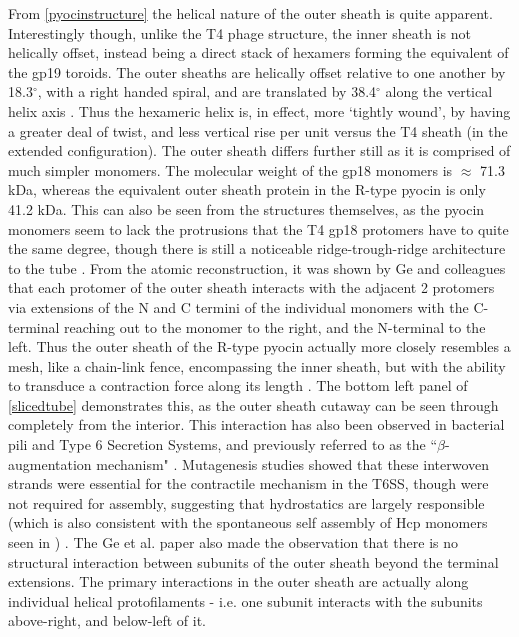 From \vref{pyocinstructure} the helical nature of the outer sheath is quite apparent. Interestingly though, unlike the T4 phage structure, the inner sheath is not helically offset, instead being a direct stack of hexamers forming the equivalent of the gp19 toroids. The outer sheaths are helically offset relative to one another by 18.3$^{\circ}$, with a right handed spiral, and are translated by 38.4$^{\circ}$ along the vertical helix axis \citep{Ge2015, Kube2015a}. Thus the hexameric helix is, in effect, more `tightly wound', by having a greater deal of twist, and less vertical rise per unit versus the T4 sheath (in the extended configuration). The outer sheath differs further still as it is comprised of much simpler monomers. The molecular weight of the gp18 monomers is $\approx$ 71.3 kDa, whereas the equivalent outer sheath protein in the R-type pyocin is only 41.2 kDa. This can also be seen from the structures themselves, as the pyocin monomers seem to lack the protrusions that the T4 gp18 protomers have to quite the same degree, though there is still a noticeable ridge-trough-ridge architecture to the tube \citep{Kube2015a}. From the atomic reconstruction, it was shown by Ge and colleagues that each protomer of the outer sheath interacts with the adjacent 2 protomers via extensions of the N and C termini of the individual monomers with the C-terminal reaching out to the monomer to the right, and the N-terminal to the left. Thus the outer sheath of the R-type pyocin actually more closely resembles a mesh, like a chain-link fence, encompassing the inner sheath, but with the ability to transduce a contraction force along its length \citep{Ge2015}. The bottom left panel of \vref{slicedtube} demonstrates this, as the outer sheath cutaway can be seen through completely from the interior. This interaction has also been observed in bacterial pili and Type 6 Secretion Systems, and previously referred to as the ``$\beta$-augmentation mechanism" \citep{Remaut2006}. Mutagenesis studies showed that these interwoven strands were essential for the contractile mechanism in the T6SS, though were not required for assembly, suggesting that hydrostatics are largely responsible (which is also consistent with the spontaneous self assembly of Hcp monomers seen in \cite{Ballister2008}) \citep{Kudryashev2015, Clemens2015}. The Ge et al. paper also made the observation that there is no structural interaction between subunits of the outer sheath beyond the terminal extensions. The primary interactions in the outer sheath are actually along individual helical protofilaments - i.e. one subunit interacts with the subunits above-right, and below-left of it. 

